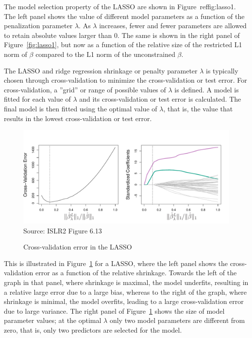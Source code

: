 The model selection property of the LASSO are shown in Figure~ref{fig:lasso1}. The left panel shows the value of different model parameters as a function of the penalization parameter $\lambda$. As $\lambda$ increases, fewer and fewer parameters are allowed to retain absolute values larger than 0. The same is shown in the right panel of Figure~\ref{fig:lasso1}, but now as a function of the relative size of the restricted L1 norm of $\beta$ compared to the L1 norm of the unconstrained $\beta$.

The LASSO and ridge regression shrinkage or penalty parameter $\lambda$ is typically chosen through cross-validation to minimize the cross-validation or test error. For cross-validation, a ''grid'' or range of possible values of $\lambda$ is defined. A model is fitted for each value of $\lambda$ and its cross-validation or test error is calculated. The final model is then fitted using the optimal value of $\lambda$, that is, the value that results in the lowest cross-validation or test error.

\begin{figure}
\centering
\includegraphics[width=.85\textwidth]{../class11/Figures_Chapters_1-6/Chapter6/6_13.pdf} \\

\scriptsize Source: ISLR2 Figure 6.13
\caption{Cross-validation error in the LASSO}
\label{fig:lasso2}
\end{figure}

This is illustrated in Figure~\ref{fig:lasso2} for a LASSO, where the left panel shows the cross-validation error as a function of the relative shrinkage. Towards the left of the graph in that panel, where shrinkage is maximal, the model underfits, resulting in a relative large error due to a large bias, whereas to the right of the graph, where shrinkage is minimal, the model overfits, leading to a large cross-validation error due to large variance. The right panel of Figure~\ref{fig:lasso2} shows the size of model parameter values; at the optimal $\lambda$ only two model parameters are different from zero, that is, only two predictors are selected for the model. 

